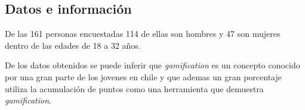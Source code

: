 \subsection{Datos e información}


De las 161 personas encuestadas 114 de ellas son hombres y 47 son mujeres dentro de las edades
de 18 a 32 años.

De los datos obtenidos se puede inferir que \emph{gamification} es un concepto conocido por una gran parte
de los jovenes en chile y que ademas un gran porcentaje utiliza la acumulación de puntos como una
herramienta que demuestra \emph{gamification}.
